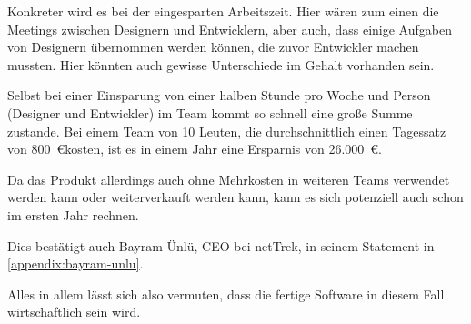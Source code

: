 Konkreter wird es bei der eingesparten Arbeitszeit.
Hier wären zum einen die Meetings zwischen Designern und Entwicklern, aber auch, dass einige Aufgaben von Designern übernommen werden können, die zuvor Entwickler machen mussten.
Hier könnten auch gewisse Unterschiede im Gehalt vorhanden sein.

Selbst bei einer Einsparung von einer halben Stunde pro Woche und Person (Designer und Entwickler) im Team kommt so schnell eine große Summe zustande.
Bei einem Team von 10 Leuten, die durchschnittlich einen Tagessatz von 800~\euro kosten, ist es in einem Jahr eine Ersparnis von 26.000~\euro.

Da das Produkt allerdings auch ohne Mehrkosten in weiteren Teams verwendet werden kann oder weiterverkauft werden kann, kann es sich potenziell auch schon im ersten Jahr rechnen.

Dies bestätigt auch Bayram Ünlü, \ac{CEO} bei \ac{netTrek}, in seinem Statement in \autoref{appendix:bayram-unlu}.

Alles in allem lässt sich also vermuten, dass die fertige Software in diesem Fall wirtschaftlich sein wird.
